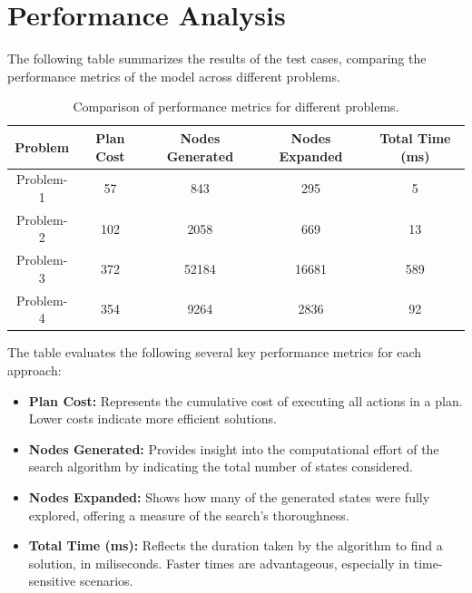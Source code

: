 \documentclass{article}
\begin{document}
\section{Performance Analysis}

The following table summarizes the results of the test cases, comparing the performance metrics of the model across different problems.

\begin{table}[ht]
    \centering
    \small
    \begin{tabular}{|c|c|c|c|c|}
        \hline
        \textbf{Problem} & \textbf{Plan Cost} & \textbf{Nodes Generated} & \textbf{Nodes Expanded} & \textbf{Total Time (ms)} \\
        \hline
        Problem-1 & 57 & 843 & 295 & 5 \\
                                   
        \hline
        Problem-2 & 102 & 2058 & 669 & 13 \\
                                   
        \hline
        Problem-3 & 372 & 52184 & 16681 & 589 \\
                                   
        \hline
        Problem-4 & 354 & 9264 & 2836 & 92 \\
                                   
        \hline
    \end{tabular}
    \caption{Comparison of performance metrics for different problems.}
    \label{tab:results}
\end{table}

The table evaluates the following several key performance metrics for each approach:

\begin{itemize}
    \item \textbf{Plan Cost:} Represents the cumulative cost of executing all actions in a plan. Lower costs indicate more efficient solutions.
    
    \item \textbf{Nodes Generated:} Provides insight into the computational effort of the search algorithm by indicating the total number of states considered.
    
    \item \textbf{Nodes Expanded:} Shows how many of the generated states were fully explored, offering a measure of the search's thoroughness.
    
    \item \textbf{Total Time (ms):} Reflects the duration taken by the algorithm to find a solution, in miliseconds. Faster times are advantageous, especially in time-sensitive scenarios.
\end{itemize}
\end{document}
